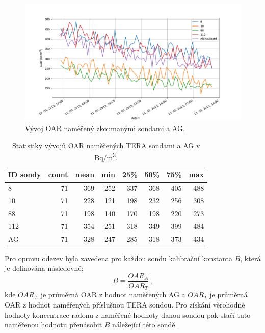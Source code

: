 \begin{figure}[ht]
	\centering
	\includegraphics[width=1\linewidth]{images/sondy_srovnani}
	\caption{Vývoj OAR naměřený zkoumanými sondami a AG.}
	\label{fig:dynMer_sondySrovnani}
\end{figure}
\begin{table}[ht]
	\centering
	\caption{Statistiky vývojů OAR naměřených TERA sondami a AG v \si{Bq/m^3}.}
	\label{tab:dynMer_sondy}
	\begin{tabular}{lrrrrrrr}
		\toprule
		ID sondy &  count &  mean    &  min &  25\% &  50\% &  75\% &  max \\
		\midrule
		8          &     71 &   369  &  252 &  337 &  368 &  405 &  488 \\
		10         &     71 &   228  &  121 &  198 &  232 &  256 &  308 \\
		88         &     71 &   198  &  140 &  170 &  198 &  220 &  273 \\
		112        &     71 &   354  &  251 &  318 &  349 &  399 &  484 \\
		\midrule
		AG &     71 &   328  &  247 &  285 &  318 &  373 &  434 \\
		\bottomrule
	\end{tabular}
      
      
\end{table}

Pro opravu odezev byla zavedena pro každou sondu kalibrační konstanta $B$, která je definována následovně:
\begin{equation}
	B=\frac{OAR_A}{OAR_T}\,,
\end{equation}
kde $OAR_A$ je průměrná OAR z hodnot naměřených AG a $OAR_T$ je průměrná OAR z hodnot naměřených příslušnou TERA sondou. Pro získání věrohodné hodnoty koncentrace radonu z naměřené hodnoty danou sondou pak stačí tuto naměřenou hodnotu přenásobit $B$ náležející této sondě.

